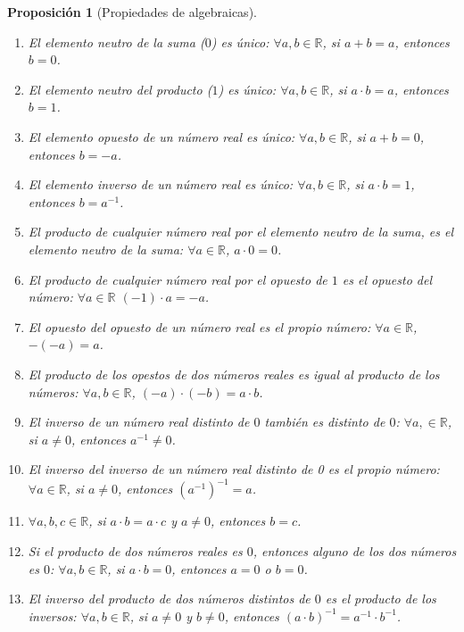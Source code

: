 \documentclass[
  a4paper,
]{scrreport}
\theoremstyle{definition}
\theoremstyle{plain}
\theoremstyle{plain}
\theoremstyle{plain}
\newtheorem{proposition}{Proposición}[chapter]
\theoremstyle{definition}
\theoremstyle{remark}
\begin{document}
\begin{proposition}[Propiedades de
algebraicas]
\begin{enumerate}
\def\labelenumi{\alph{enumi}.}
\item
  El elemento neutro de la suma (\(0\)) es único:
  \(\forall a,b\in \mathbb{R}\), si \(a+b=a\), entonces \(b=0\).
\item
  El elemento neutro del producto (\(1\)) es único:
  \(\forall a,b\in \mathbb{R}\), si \(a\cdot b = a\), entonces \(b=1\).
\item
  El elemento opuesto de un número real es único:
  \(\forall a,b\in \mathbb{R}\), si \(a+b=0\), entonces \(b=-a\).
\item
  El elemento inverso de un número real es único:
  \(\forall a,b\in \mathbb{R}\), si \(a\cdot b=1\), entonces
  \(b=a^{-1}\).
\item
  El producto de cualquier número real por el elemento neutro de la
  suma, es el elemento neutro de la suma: \(\forall a\in\mathbb{R}\),
  \(a\cdot 0 = 0\).
\item
  El producto de cualquier número real por el opuesto de \(1\) es el
  opuesto del número: \(\forall a\in\mathbb{R}\) \((-1)\cdot a = -a\).
\item
  El opuesto del opuesto de un número real es el propio número:
  \(\forall a\in\mathbb{R}\), \(-(-a)=a\).
\item
  El producto de los opestos de dos números reales es igual al producto
  de los números: \(\forall a,b\in\mathbb{R}\),
  \((-a) \cdot (-b) = a\cdot b\).
\item
  El inverso de un número real distinto de \(0\) también es distinto de
  \(0\): \(\forall a,\in\mathbb{R}\), si \(a\neq 0\), entonces
  \(a^{-1}\neq 0\).
\item
  El inverso del inverso de un número real distinto de 0 es el propio
  número: \(\forall a\in\mathbb{R}\), si \(a\neq 0\), entonces
  \((a^{-1})^{-1}=a\).
\item
  \(\forall a,b,c\in \mathbb{R}\), si \(a\cdot b=a\cdot c\) y
  \(a\neq 0\), entonces \(b=c\).
\item
  Si el producto de dos números reales es \(0\), entonces alguno de los
  dos números es \(0\): \(\forall a,b\in\mathbb{R}\), si \(a\cdot b=0\),
  entonces \(a=0\) o \(b=0\).
\item
  El inverso del producto de dos números distintos de \(0\) es el
  producto de los inversos: \(\forall a,b\in \mathbb{R}\), si
  \(a\neq 0\) y \(b\neq 0\), entonces
  \((a\cdot b)^{-1} = a^{-1}\cdot b^{-1}\).
\end{enumerate}

\end{proposition}
\end{document}
